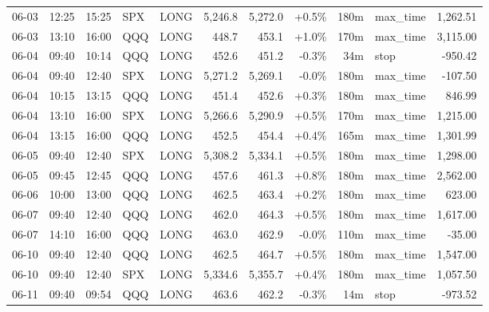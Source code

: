 \documentclass[11pt,a4paper,twoside]{article}
\begin{document}
\begin{center}
\begin{longtable}{>{\color{txtmain}}l l l l l r r r r >{\color{txtmain}}l r}
06-03 & 12:25 & 15:25 & SPX & LONG & 5,246.8 & 5,272.0 & \textcolor{wingreen}{+0.5\%} & 180m & max\_time & \textcolor{wingreen}{1,262.51} \\
06-03 & 13:10 & 16:00 & QQQ & LONG & 448.7 & 453.1 & \textcolor{wingreen}{+1.0\%} & 170m & max\_time & \textcolor{wingreen}{3,115.00} \\
06-04 & 09:40 & 10:14 & QQQ & LONG & 452.6 & 451.2 & \textcolor{lossred}{-0.3\%} & 34m & stop & \textcolor{lossred}{-950.42} \\
06-04 & 09:40 & 12:40 & SPX & LONG & 5,271.2 & 5,269.1 & \textcolor{lossred}{-0.0\%} & 180m & max\_time & \textcolor{lossred}{-107.50} \\
06-04 & 10:15 & 13:15 & QQQ & LONG & 451.4 & 452.6 & \textcolor{wingreen}{+0.3\%} & 180m & max\_time & \textcolor{wingreen}{846.99} \\
06-04 & 13:10 & 16:00 & SPX & LONG & 5,266.6 & 5,290.9 & \textcolor{wingreen}{+0.5\%} & 170m & max\_time & \textcolor{wingreen}{1,215.00} \\
06-04 & 13:15 & 16:00 & QQQ & LONG & 452.5 & 454.4 & \textcolor{wingreen}{+0.4\%} & 165m & max\_time & \textcolor{wingreen}{1,301.99} \\
06-05 & 09:40 & 12:40 & SPX & LONG & 5,308.2 & 5,334.1 & \textcolor{wingreen}{+0.5\%} & 180m & max\_time & \textcolor{wingreen}{1,298.00} \\
06-05 & 09:45 & 12:45 & QQQ & LONG & 457.6 & 461.3 & \textcolor{wingreen}{+0.8\%} & 180m & max\_time & \textcolor{wingreen}{2,562.00} \\
06-06 & 10:00 & 13:00 & QQQ & LONG & 462.5 & 463.4 & \textcolor{wingreen}{+0.2\%} & 180m & max\_time & \textcolor{wingreen}{623.00} \\
06-07 & 09:40 & 12:40 & QQQ & LONG & 462.0 & 464.3 & \textcolor{wingreen}{+0.5\%} & 180m & max\_time & \textcolor{wingreen}{1,617.00} \\
06-07 & 14:10 & 16:00 & QQQ & LONG & 463.0 & 462.9 & \textcolor{lossred}{-0.0\%} & 110m & max\_time & \textcolor{lossred}{-35.00} \\
06-10 & 09:40 & 12:40 & QQQ & LONG & 462.5 & 464.7 & \textcolor{wingreen}{+0.5\%} & 180m & max\_time & \textcolor{wingreen}{1,547.00} \\
06-10 & 09:40 & 12:40 & SPX & LONG & 5,334.6 & 5,355.7 & \textcolor{wingreen}{+0.4\%} & 180m & max\_time & \textcolor{wingreen}{1,057.50} \\
06-11 & 09:40 & 09:54 & QQQ & LONG & 463.6 & 462.2 & \textcolor{lossred}{-0.3\%} & 14m & stop & \textcolor{lossred}{-973.52} \\

\end{longtable}
\end{center}
\end{document}

